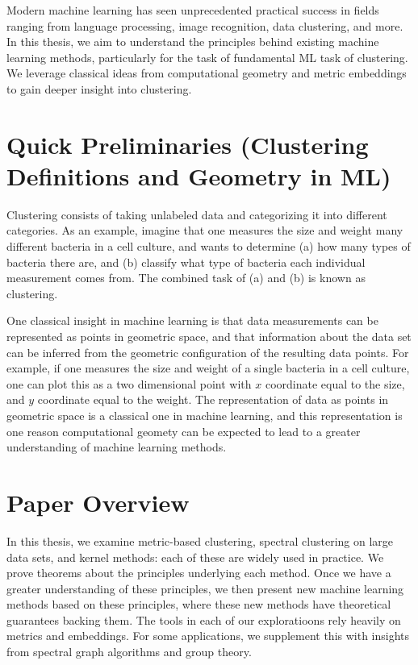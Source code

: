 Modern machine learning has seen unprecedented practical success in fields ranging
from language processing, image recognition, data clustering, and more.
In this thesis, we aim to understand the principles behind existing
machine learning methods, particularly for the task of fundamental ML
task of clustering. We
leverage classical ideas from computational geometry and metric embeddings to gain deeper
insight into clustering.

\section{Quick Preliminaries (Clustering Definitions and Geometry in ML)}

Clustering consists of taking unlabeled data and categorizing it into different
categories. As an example, imagine that one measures the size and weight
many different bacteria in a cell culture, and wants to determine (a) how many
types of bacteria there are, and (b) classify what type of bacteria each
individual measurement comes from.  The combined task of (a) and (b) is
known as clustering.

One classical insight in machine learning is that data measurements can
be represented as points in geometric space, and that information about
the data set can be inferred from the geometric configuration of the
resulting data points. For example, if one measures the size and weight
of a single bacteria in a cell culture, one can plot this as a two
dimensional point with $x$ coordinate equal to the size, and $y$
coordinate equal to the weight. The representation of data as points in
geometric space is a classical one in machine learning, and this
representation is one reason computational geomety can be expected to
lead to a greater understanding of machine learning methods.


\section{Paper Overview}

In this thesis, we examine metric-based clustering, spectral clustering
on large data sets, and kernel methods: each of these are widely used in
practice. We prove theorems about the principles underlying each method.
Once we have a greater understanding of these principles, we then
present new machine learning methods based on these principles, where
these new methods have theoretical guarantees backing them.
The tools in each of our exploratioons rely heavily on metrics and
embeddings.  For some applications, we supplement this with insights
from spectral graph algorithms and group theory.

